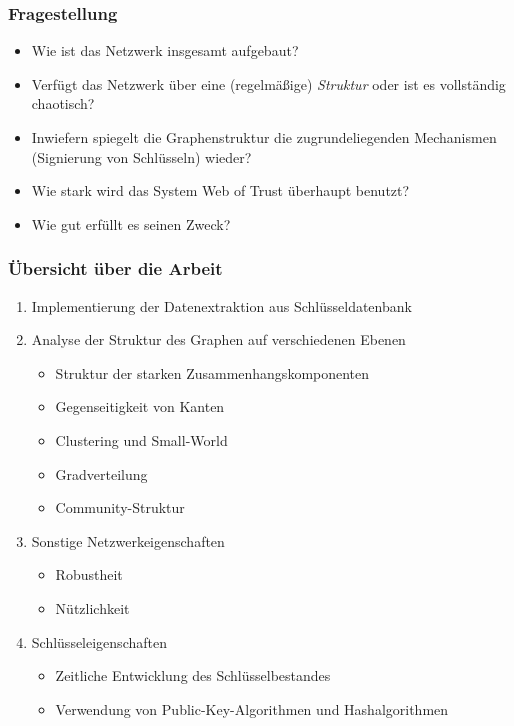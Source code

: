 \documentclass[10pt]{beamer}
\begin{document}
\begin{frame}
  \frametitle{Fragestellung}
  \begin{itemize}
  \item Wie ist das Netzwerk insgesamt aufgebaut?
  \item Verf\"ugt das Netzwerk \"uber eine (regelm\"a{\ss}ige)
    \emph{Struktur} oder ist es vollst\"andig chaotisch?
  \item Inwiefern spiegelt die Graphenstruktur die zugrundeliegenden
    Mechanismen (Signierung von Schl\"usseln) wieder?
  \item Wie stark wird das System Web of Trust \"uberhaupt benutzt?
  \item Wie gut erf\"ullt es seinen Zweck?
  \end{itemize}
\end{frame}

\begin{frame}
  \frametitle{\"Ubersicht \"uber die Arbeit}
  \begin{enumerate}
  \item Implementierung der Datenextraktion aus Schl\"usseldatenbank
  \item Analyse der Struktur des Graphen auf verschiedenen Ebenen
    \begin{itemize}
    \item Struktur der starken Zusammenhangskomponenten
    \item Gegenseitigkeit von Kanten
    \item Clustering und Small-World
    \item Gradverteilung
    \item Community-Struktur
    \end{itemize}
  \item Sonstige Netzwerkeigenschaften
    \begin{itemize}
    \item Robustheit
    \item N\"utzlichkeit
    \end{itemize}
  \item Schl\"usseleigenschaften
    \begin{itemize}
    \item Zeitliche Entwicklung des Schl\"usselbestandes
    \item Verwendung von Public-Key-Algorithmen und Hashalgorithmen
\end{itemize}
  \end{enumerate}
\end{frame}
\end{document}
